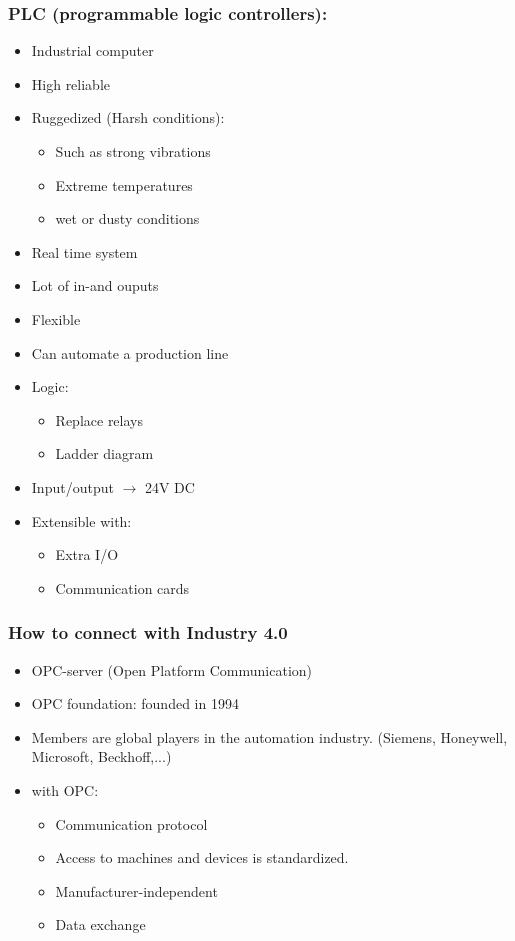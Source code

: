 \documentclass[12pt]{article}
\begin{document}
\subsubsection{PLC (programmable logic controllers):}
\begin{itemize}
    \item Industrial computer 
    \item High reliable 
    \item Ruggedized (Harsh conditions):\begin{itemize}
        \item Such as strong vibrations 
        \item Extreme temperatures 
        \item wet or dusty conditions
    \end{itemize}
    \item Real time system 
    \item Lot of in-and ouputs
    \item Flexible 
    \item Can automate a production line
\end{itemize}
\begin{itemize}
    \item Logic:\begin{itemize}
        \item Replace relays
        \item Ladder diagram
    \end{itemize}
    \item Input/output $\rightarrow$ 24V DC
    \item Extensible with:\begin{itemize}
        \item Extra I/O 
        \item Communication cards
    \end{itemize}
\end{itemize}
\subsubsection{How to connect with Industry 4.0}
\begin{itemize}
    \item OPC-server (Open Platform Communication)
    \item OPC foundation: founded in 1994
    \item Members are global players in the automation industry. (Siemens, Honeywell, Microsoft, Beckhoff,...)
    \item with OPC:\begin{itemize}
        \item Communication protocol 
        \item Access to machines and devices is standardized.
        \item Manufacturer-independent
        \item Data exchange
    \end{itemize}
\end{itemize}
\end{document}
